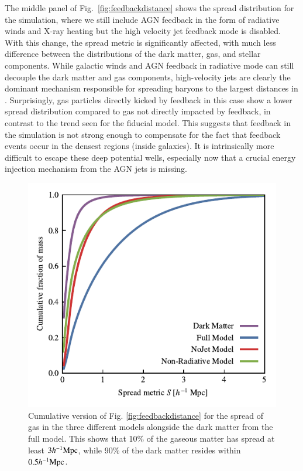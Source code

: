 The middle panel of Fig.~\ref{fig:feedbackdistance} shows the spread
distribution for the \nojet{} simulation, where we still include AGN feedback
in the form of radiative winds and X-ray heating but the high velocity jet
feedback mode is disabled. With this change, the spread metric is
significantly affected, with much less difference between the distributions
of the dark matter, gas, and stellar components. While galactic winds and AGN
feedback in radiative mode can still decouple the dark matter and gas
components, high-velocity jets are clearly the dominant mechanism responsible
for spreading baryons to the largest distances in \simba{}. Surprisingly, gas
particles directly kicked by feedback in this case show a lower spread
distribution compared to gas not directly impacted by feedback, in contrast
to the trend seen for the fiducial \simba{} model. This suggests that
feedback in the \nojet{} simulation is not strong enough to compensate for the
fact that feedback events occur in the densest regions (inside galaxies). It is
intrinsically more difficult to escape these deep potential wells, especially
now that a crucial energy injection mechanism from the AGN jets is missing.


\begin{figure}
    \centering
    \includegraphics{figures/cumulative_histogram_comparison.pdf}
    \vspace{-0.7cm}
    \caption{Cumulative version of Fig. \ref{fig:feedbackdistance} for the spread of gas
    in the three different models alongside the dark matter from the full model.
    This shows that 10\% of the gaseous matter has spread at least $3h^{-1}{\rm Mpc}{}$,
    while 90\% of the dark matter resides within $0.5 h^{-1}{\rm Mpc}{}$.}
    \label{fig:cumulativehistogram}
\end{figure}


